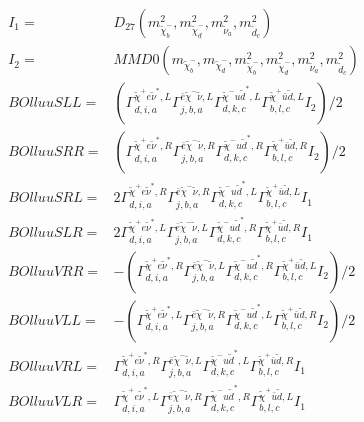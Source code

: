 \documentclass[A4,landscape]{article}
\begin{document}
\begin{align} 
I_1 = & D_{27}(m^2_{\tilde{\chi}^-_{{b}}}, m^2_{\tilde{\chi}^-_{{d}}}, m^2_{\tilde{\nu}_{{a}}}, m^2_{\tilde{d}_{{c}}}) \\ 
I_2 = & MMD0(m_{\tilde{\chi}^-_{{b}}}, m_{\tilde{\chi}^-_{{d}}}, m^2_{\tilde{\chi}^-_{{b}}}, m^2_{\tilde{\chi}^-_{{d}}}, m^2_{\tilde{\nu}_{{a}}}, m^2_{\tilde{d}_{{c}}}) \\ 
  BOlluuSLL= & ( \Gamma^{\tilde{\chi}^+e \tilde{\nu}^*,L}_{d, i, a} \Gamma^{\bar{e}\tilde{\chi}^- \tilde{\nu} ,L}_{j, b, a} \Gamma^{\tilde{\chi}^- u \tilde{d}^*,L}_{d, k, c} \Gamma^{\tilde{\chi}^+\bar{u}\tilde{d} ,L}_{b, l, c} I_2)/2 \\ 
  BOlluuSRR= & ( \Gamma^{\tilde{\chi}^+e \tilde{\nu}^*,R}_{d, i, a} \Gamma^{\bar{e}\tilde{\chi}^- \tilde{\nu} ,R}_{j, b, a} \Gamma^{\tilde{\chi}^- u \tilde{d}^*,R}_{d, k, c} \Gamma^{\tilde{\chi}^+\bar{u}\tilde{d} ,R}_{b, l, c} I_2)/2 \\ 
  BOlluuSRL= & 2  \Gamma^{\tilde{\chi}^+e \tilde{\nu}^*,R}_{d, i, a} \Gamma^{\bar{e}\tilde{\chi}^- \tilde{\nu} ,R}_{j, b, a} \Gamma^{\tilde{\chi}^- u \tilde{d}^*,L}_{d, k, c} \Gamma^{\tilde{\chi}^+\bar{u}\tilde{d} ,L}_{b, l, c} I_1 \\ 
  BOlluuSLR= & 2  \Gamma^{\tilde{\chi}^+e \tilde{\nu}^*,L}_{d, i, a} \Gamma^{\bar{e}\tilde{\chi}^- \tilde{\nu} ,L}_{j, b, a} \Gamma^{\tilde{\chi}^- u \tilde{d}^*,R}_{d, k, c} \Gamma^{\tilde{\chi}^+\bar{u}\tilde{d} ,R}_{b, l, c} I_1 \\ 
  BOlluuVRR= & -( \Gamma^{\tilde{\chi}^+e \tilde{\nu}^*,R}_{d, i, a} \Gamma^{\bar{e}\tilde{\chi}^- \tilde{\nu} ,L}_{j, b, a} \Gamma^{\tilde{\chi}^- u \tilde{d}^*,R}_{d, k, c} \Gamma^{\tilde{\chi}^+\bar{u}\tilde{d} ,L}_{b, l, c} I_2)/2 \\ 
  BOlluuVLL= & -( \Gamma^{\tilde{\chi}^+e \tilde{\nu}^*,L}_{d, i, a} \Gamma^{\bar{e}\tilde{\chi}^- \tilde{\nu} ,R}_{j, b, a} \Gamma^{\tilde{\chi}^- u \tilde{d}^*,L}_{d, k, c} \Gamma^{\tilde{\chi}^+\bar{u}\tilde{d} ,R}_{b, l, c} I_2)/2 \\ 
  BOlluuVRL= &  \Gamma^{\tilde{\chi}^+e \tilde{\nu}^*,R}_{d, i, a} \Gamma^{\bar{e}\tilde{\chi}^- \tilde{\nu} ,L}_{j, b, a} \Gamma^{\tilde{\chi}^- u \tilde{d}^*,L}_{d, k, c} \Gamma^{\tilde{\chi}^+\bar{u}\tilde{d} ,R}_{b, l, c} I_1 \\ 
  BOlluuVLR= &  \Gamma^{\tilde{\chi}^+e \tilde{\nu}^*,L}_{d, i, a} \Gamma^{\bar{e}\tilde{\chi}^- \tilde{\nu} ,R}_{j, b, a} \Gamma^{\tilde{\chi}^- u \tilde{d}^*,R}_{d, k, c} \Gamma^{\tilde{\chi}^+\bar{u}\tilde{d} ,L}_{b, l, c} I_1 \\ 

\end{align}
\end{document}
